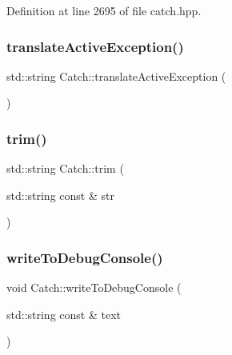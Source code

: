 Definition at line 2695 of file catch.\+hpp.

\hypertarget{namespace_catch_adafff91485eeeeb9e9333f317cc0e3b1}{}\label{namespace_catch_adafff91485eeeeb9e9333f317cc0e3b1} 
\subsubsection{\texorpdfstring{translate\+Active\+Exception()}{translateActiveException()}}
{\footnotesize\ttfamily std\+::string Catch\+::translate\+Active\+Exception (\begin{DoxyParamCaption}{ }\end{DoxyParamCaption})}

\hypertarget{namespace_catch_a084108b47f37d8bfd5db51c50c7451b3}{}\label{namespace_catch_a084108b47f37d8bfd5db51c50c7451b3} 
\subsubsection{\texorpdfstring{trim()}{trim()}}
{\footnotesize\ttfamily std\+::string Catch\+::trim (\begin{DoxyParamCaption}\item[{std\+::string const \&}]{str }\end{DoxyParamCaption})}

\hypertarget{namespace_catch_aa5dcf4750ce9a854f4b74d3c952d13cc}{}\label{namespace_catch_aa5dcf4750ce9a854f4b74d3c952d13cc} 
\subsubsection{\texorpdfstring{write\+To\+Debug\+Console()}{writeToDebugConsole()}}
{\footnotesize\ttfamily void Catch\+::write\+To\+Debug\+Console (\begin{DoxyParamCaption}\item[{std\+::string const \&}]{text }\end{DoxyParamCaption})}

